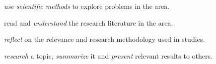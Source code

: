 \item \emph{use scientific methods} to explore problems in the area.
\item read and \emph{understand} the research literature in the area.
\item \emph{reflect} on the relevance and research methodology used in studies.
\item \emph{research} a topic, \emph{summarize} it and \emph{present} relevant 
  results to others.
